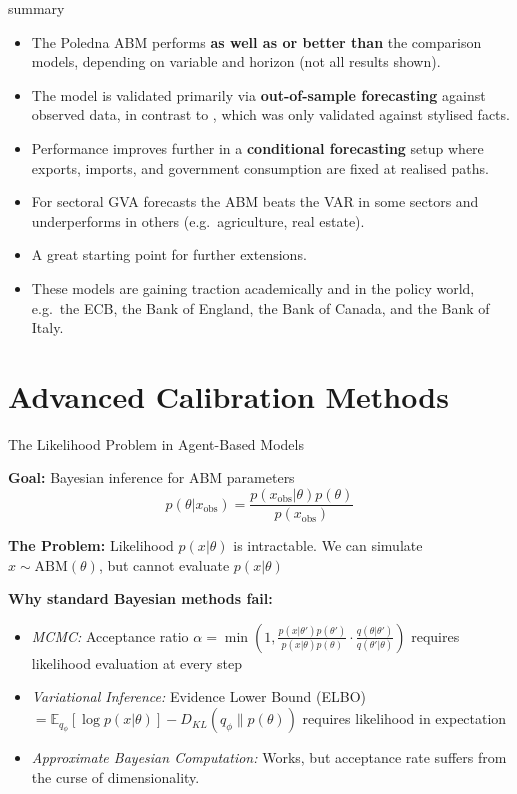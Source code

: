 \documentclass[9pt]{beamer}
\begin{document}
\begin{frame}{\cite{poledna_economic_2019} summary}
    \begin{itemize}
        \item The Poledna ABM performs \textbf{as well as or better than} the comparison models, depending on variable and horizon (not all results shown).
        \item The model is validated primarily via \textbf{out-of-sample forecasting} against observed data, in contrast to \cite{assenza_emergent_2015}, which was only validated against stylised facts.
        \item Performance improves further in a \textbf{conditional forecasting} setup where exports, imports, and government consumption are fixed at realised paths.
        \item For sectoral GVA forecasts the ABM beats the VAR in some sectors and underperforms in others (e.g.\ agriculture, real estate).
        \item A great starting point for further extensions.
        \item These models are gaining traction academically and in the policy world, e.g.\ the ECB, the Bank of England, the Bank of Canada, and the Bank of Italy.
    \end{itemize}
\end{frame}

\section{Advanced Calibration Methods}
\begin{frame}{The Likelihood Problem in Agent-Based Models}
\label{SBI-motivation}

\textbf{Goal:} Bayesian inference for ABM parameters
$$p(\theta|x_{\text{obs}}) = \frac{p(x_{\text{obs}}|\theta)p(\theta)}{p(x_{\text{obs}})}$$

\textbf{The Problem:} Likelihood $p(x|\theta)$ is intractable. We can simulate $x \sim \text{ABM}(\theta)$, but cannot evaluate $p(x|\theta)$

\textbf{Why standard Bayesian methods fail:}
\begin{itemize}
    \item \textit{MCMC:} Acceptance ratio $\alpha = \min\left(1, \frac{p(x|\theta')p(\theta')}{p(x|\theta)p(\theta)}\cdot\frac{q(\theta|\theta')}{q(\theta'|\theta)}\right)$ requires likelihood evaluation at every step
    
    \item \textit{Variational Inference:} Evidence Lower Bound (ELBO) $= \mathbb{E}_{q_\phi}\left[\log p(x|\theta)\right] - D_{KL}(q_\phi \| p(\theta))$ requires likelihood in expectation
    
    \item \textit{Approximate Bayesian Computation:} Works, but acceptance rate suffers from the curse of dimensionality.
\end{itemize}

\end{frame}
\end{document}
